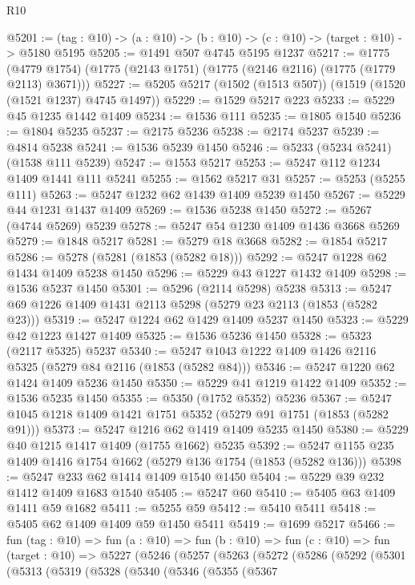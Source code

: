 \begin{lexlean}{R10}
\begin{coremodule}
@5201 := (tag : @10) -> (a : @10) -> (b : @10) -> (c : @10) -> (target : @10) -> @5180 @5195
@5205 := @1491 @507 @4745 @5195 @1237
@5217 := @1775 (@4779 @1754) (@1775 (@2143 @1751) (@1775 (@2146 @2116) (@1775 (@1779 @2113) @3671)))
@5227 := @5205 @5217 (@1502 (@1513 @507)) (@1519 (@1520 (@1521 @1237) @4745 @1497))
@5229 := @1529 @5217 @223
@5233 := @5229 @45 @1235 @1442 @1409
@5234 := @1536 @111
@5235 := @1805 @1540
@5236 := @1804 @5235
@5237 := @2175 @5236
@5238 := @2174 @5237
@5239 := @4814 @5238
@5241 := @1536 @5239 @1450
@5246 := @5233 (@5234 @5241) (@1538 @111 @5239)
@5247 := @1553 @5217
@5253 := @5247 @112 @1234 @1409 @1441 @111 @5241
@5255 := @1562 @5217 @31
@5257 := @5253 (@5255 @111)
@5263 := @5247 @1232 @62 @1439 @1409 @5239 @1450
@5267 := @5229 @44 @1231 @1437 @1409
@5269 := @1536 @5238 @1450
@5272 := @5267 (@4744 @5269) @5239
@5278 := @5247 @54 @1230 @1409 @1436 @3668 @5269
@5279 := @1848 @5217
@5281 := @5279 @18 @3668
@5282 := @1854 @5217
@5286 := @5278 (@5281 (@1853 (@5282 @18)))
@5292 := @5247 @1228 @62 @1434 @1409 @5238 @1450
@5296 := @5229 @43 @1227 @1432 @1409
@5298 := @1536 @5237 @1450
@5301 := @5296 (@2114 @5298) @5238
@5313 := @5247 @69 @1226 @1409 @1431 @2113 @5298 (@5279 @23 @2113 (@1853 (@5282 @23)))
@5319 := @5247 @1224 @62 @1429 @1409 @5237 @1450
@5323 := @5229 @42 @1223 @1427 @1409
@5325 := @1536 @5236 @1450
@5328 := @5323 (@2117 @5325) @5237
@5340 := @5247 @1043 @1222 @1409 @1426 @2116 @5325 (@5279 @84 @2116 (@1853 (@5282 @84)))
@5346 := @5247 @1220 @62 @1424 @1409 @5236 @1450
@5350 := @5229 @41 @1219 @1422 @1409
@5352 := @1536 @5235 @1450
@5355 := @5350 (@1752 @5352) @5236
@5367 := @5247 @1045 @1218 @1409 @1421 @1751 @5352 (@5279 @91 @1751 (@1853 (@5282 @91)))
@5373 := @5247 @1216 @62 @1419 @1409 @5235 @1450
@5380 := @5229 @40 @1215 @1417 @1409 (@1755 @1662) @5235
@5392 := @5247 @1155 @235 @1409 @1416 @1754 @1662 (@5279 @136 @1754 (@1853 (@5282 @136)))
@5398 := @5247 @233 @62 @1414 @1409 @1540 @1450
@5404 := @5229 @39 @232 @1412 @1409 @1683 @1540
@5405 := @5247 @60
@5410 := @5405 @63 @1409 @1411 @59 @1682
@5411 := @5255 @59
@5412 := @5410 @5411
@5418 := @5405 @62 @1409 @1409 @59 @1450 @5411
@5419 := @1699 @5217
@5466 := fun (tag : @10) =>
  fun (a : @10) =>
  fun (b : @10) =>
  fun (c : @10) =>
  fun (target : @10) =>
  @5227
    (@5246
      (@5257
        (@5263
          (@5272
            (@5286
              (@5292
                (@5301
                  (@5313
                    (@5319
                      (@5328
                        (@5340
                          (@5346
                            (@5355
                              (@5367

\end{coremodule}
\end{lexlean}
